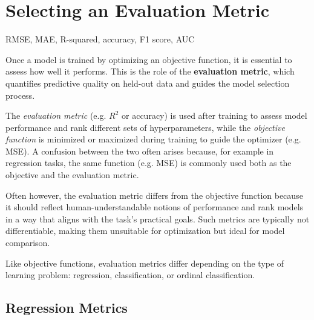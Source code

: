 \documentclass[12pt,openany]{book}
\begin{document}
\section{Selecting an Evaluation Metric}

\begin{keywordsbox}
RMSE, MAE, R-squared, accuracy, F1 score, AUC
\end{keywordsbox}

Once a model is trained by optimizing an objective function, it is 
essential to assess how well it performs. This is the role of the 
\textbf{evaluation metric}, which quantifies predictive quality on 
held-out data and guides the model selection process.

\begin{notebox}
The \textit{evaluation metric} 
(e.g. $R^2$ or accuracy) is used after training to assess model performance 
and rank different sets of hyperparameters, while the \textit{objective function} is minimized or maximized during training to guide the optimizer (e.g. MSE). A confusion between the two 
often arises because, for example in regression tasks, the same function (e.g. MSE) is commonly used both as the objective and the evaluation metric.
\end{notebox}

Often however, the evaluation metric differs from the objective function 
because it should reflect human-understandable notions of performance 
and rank models in a way that aligns with the task’s practical goals. 
Such metrics are typically not differentiable, making them unsuitable 
for optimization but ideal for model comparison.
\newline

Like objective functions, evaluation metrics differ depending on the 
type of learning problem: regression, classification, or ordinal 
classification.

\subsection{Regression Metrics}
\end{document}
